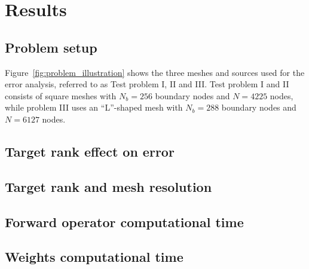 \section{Results}
\subsection{Problem setup}

Figure~\ref{fig:problem_illustration} shows the three meshes and sources used for the error analysis, referred to as Test problem I, II and III. Test problem I and II consists of square meshes with $N_b=256$ boundary nodes and $N=4225$ nodes, while problem III uses an ``L''-shaped mesh with $N_b=288$ boundary nodes and $N=6127$ nodes.


\subsection{Target rank effect on error}






\subsection{Target rank and mesh resolution}



\subsection{Forward operator computational time}



\subsection{Weights computational time}
